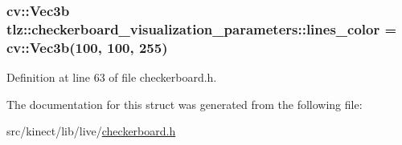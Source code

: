 \subsubsection[{\texorpdfstring{lines\+\_\+color}{lines_color}}]{\setlength{\rightskip}{0pt plus 5cm}cv\+::\+Vec3b tlz\+::checkerboard\+\_\+visualization\+\_\+parameters\+::lines\+\_\+color = cv\+::\+Vec3b(100, 100, 255)}\hypertarget{structtlz_1_1checkerboard__visualization__parameters_a82a26ebc9751cc9f44f9b1ff1b901e58}{}\label{structtlz_1_1checkerboard__visualization__parameters_a82a26ebc9751cc9f44f9b1ff1b901e58}


Definition at line 63 of file checkerboard.\+h.



The documentation for this struct was generated from the following file\+:\begin{DoxyCompactItemize}
\item 
src/kinect/lib/live/\hyperlink{checkerboard_8h}{checkerboard.\+h}\end{DoxyCompactItemize}
